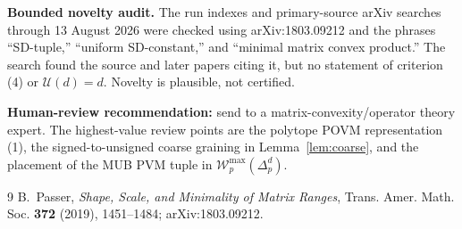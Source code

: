 \documentclass[11pt]{article}
\newcommand{\W}{\mathcal W}
\begin{document}
\textbf{Bounded novelty audit.}  The run indexes and primary-source arXiv
searches through 13 August 2026 were checked using arXiv:1803.09212 and the
phrases ``SD-tuple,'' ``uniform SD-constant,'' and ``minimal matrix convex
product.''  The search found the source and later papers citing it, but no
statement of criterion (4) or $\mathcal U(d)=d$.  Novelty is plausible, not
certified.

\textbf{Human-review recommendation:} send to a matrix-convexity/operator
theory expert.  The highest-value review points are the polytope POVM
representation (1), the signed-to-unsigned coarse graining in
Lemma~\ref{lem:coarse}, and the placement of the MUB PVM tuple in
$\W^{\max}_p(\Delta_p^d)$.

\begin{thebibliography}{9}
B.~Passer,
\emph{Shape, Scale, and Minimality of Matrix Ranges},
Trans. Amer. Math. Soc. \textbf{372} (2019), 1451--1484;
arXiv:1803.09212.
\end{thebibliography}
\end{document}
